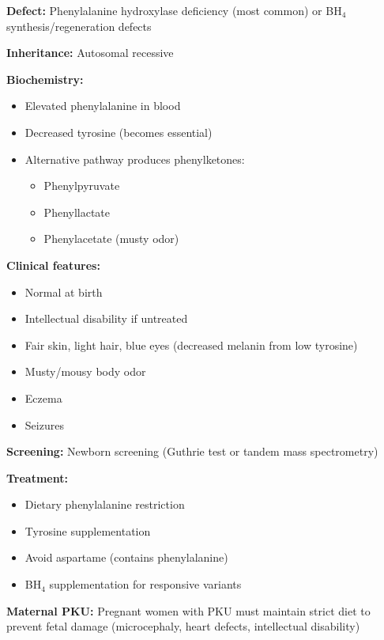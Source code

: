 \begin{tcolorbox}[colback=red!5, colframe=red!70!black, title=\textbf{Clinical Correlation: Phenylketonuria (PKU)}]
\textbf{Defect:} Phenylalanine hydroxylase deficiency (most common) or BH$_4$ synthesis/regeneration defects

\textbf{Inheritance:} Autosomal recessive

\textbf{Biochemistry:}
\begin{itemize}
    \item Elevated phenylalanine in blood
    \item Decreased tyrosine (becomes essential)
    \item Alternative pathway produces phenylketones:
    \begin{itemize}
        \item Phenylpyruvate
        \item Phenyllactate
        \item Phenylacetate (musty odor)
    \end{itemize}
\end{itemize}

\textbf{Clinical features:}
\begin{itemize}
    \item Normal at birth
    \item Intellectual disability if untreated
    \item Fair skin, light hair, blue eyes (decreased melanin from low tyrosine)
    \item Musty/mousy body odor
    \item Eczema
    \item Seizures
\end{itemize}

\textbf{Screening:} Newborn screening (Guthrie test or tandem mass spectrometry)

\textbf{Treatment:}
\begin{itemize}
    \item Dietary phenylalanine restriction
    \item Tyrosine supplementation
    \item Avoid aspartame (contains phenylalanine)
    \item BH$_4$ supplementation for responsive variants
\end{itemize}

\textbf{Maternal PKU:} Pregnant women with PKU must maintain strict diet to prevent fetal damage (microcephaly, heart defects, intellectual disability)
\end{tcolorbox}

